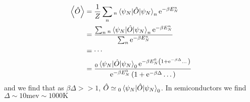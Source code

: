\begin{align}
\expval{\hat{O}} &= \frac{1}{Z}\sum_n {}_n\expval{\hat{O}}{\psi_N}_n\mathrm{e}^{-\beta E_N^n} \nonumber\\
&= \frac{\sum_n {}_n\expval{\hat{O}}{\psi_N}_n\mathrm{e}^{-\beta E_N^n}}{\sum_n\mathrm{e}^{-\beta E_N^n}} \nonumber\\
&= \cdots \nonumber\\
&= \frac{{}_0\expval{\hat{O}}{\psi_N}_0\mathrm{e}^{-\beta E_N^0\left(1+\mathrm{e}^{-\beta\Delta}\dots\right)}}{\mathrm{e}^{-\beta E_N^0}\left(1+\mathrm{e}^{-\beta\Delta}\dots\right)}
\end{align}
and we find that as $\beta\Delta >> 1$, $\hat{O} \simeq {}_0\expval{\hat{O}}{\psi_N}_0$.
In semiconductors we find $\Delta \sim 10\mathrm{mev} \sim 1000\mathrm{K}$



















